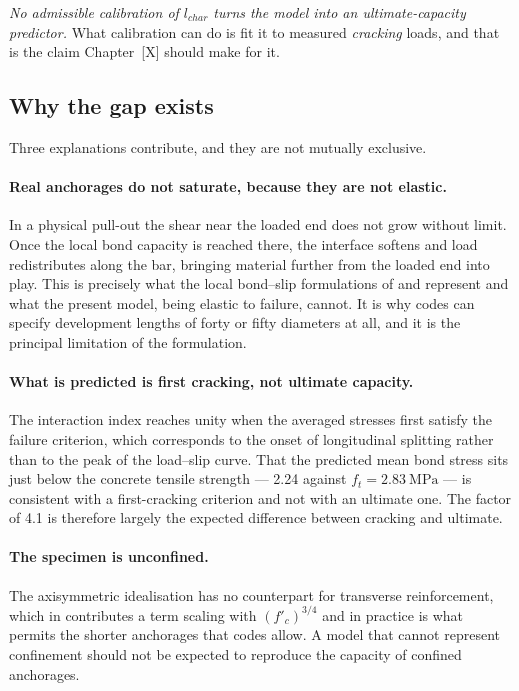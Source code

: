 \emph{No admissible calibration of $l_{char}$ turns the model into an
ultimate-capacity predictor.} What calibration can do is fit it to measured
\emph{cracking} loads, and that is the claim Chapter~[X] should make for it.

\subsection{Why the gap exists}

Three explanations contribute, and they are not mutually exclusive.

\paragraph{Real anchorages do not saturate, because they are not elastic.}
In a physical pull-out the shear near the loaded end does not grow without
limit. Once the local bond capacity is reached there, the interface softens
and load redistributes along the bar, bringing material further from the
loaded end into play. This is precisely what the local bond--slip
formulations of \textcite{tangModelingLocalBond2020} and
\textcite{chuNewBondModel2019} represent and what the present model, being
elastic to failure, cannot. It is why codes can specify development lengths
of forty or fifty diameters at all, and it is the principal limitation of
the formulation.

\paragraph{What is predicted is first cracking, not ultimate capacity.}
The interaction index reaches unity when the averaged stresses first satisfy
the failure criterion, which corresponds to the onset of longitudinal
splitting rather than to the peak of the load--slip curve. That the
predicted mean bond stress sits just below the concrete tensile strength
--- \SI{2.24}{} against $f_t = \SI{2.83}{\mega\pascal}$ --- is consistent
with a first-cracking criterion and not with an ultimate one. The factor of
\num{4.1} is therefore largely the expected difference between cracking and
ultimate.

\paragraph{The specimen is unconfined.}
The axisymmetric idealisation has no counterpart for transverse
reinforcement, which in \textcite{408R03BondDevelopment} contributes a term
scaling with $(f'_c)^{3/4}$ and in practice is what permits the shorter
anchorages that codes allow. A model that cannot represent confinement
should not be expected to reproduce the capacity of confined anchorages.

